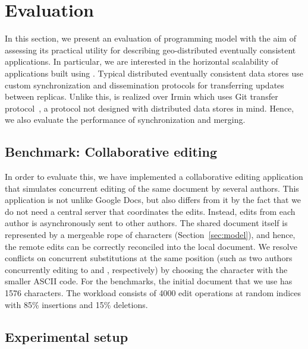 \section{Evaluation}
\label{sec:evaluation}

In this section, we present an evaluation of \name programming model with the
aim of assessing its practical utility for describing geo-distributed
eventually consistent applications. In particular, we are interested in the
horizontal scalability of applications built using \name. Typical distributed
eventually consistent data stores use custom synchronization and dissemination
protocols for transferring updates between replicas. Unlike this, \name is
realized over Irmin which uses Git transfer protocol~\cite{..}, a protocol not designed
with distributed data stores in mind. Hence, we also evaluate the performance
of synchronization and merging.

\subsection{Benchmark: Collaborative editing}

In order to evaluate this, we have implemented a collaborative editing
application that simulates concurrent editing of the same document by several
authors. This application is not unlike Google Docs, but also differs from it
by the fact that we do not need a central server that coordinates the edits.
Instead, edits from each author is asynchronously sent to other authors. The
shared document itself is represented by a mergeable rope of characters
(Section~\ref{sec:model}), and hence, the remote edits can be correctly
reconciled into the local document. We resolve conflicts on concurrent
substitutions at the same position (such as two authors concurrently editing
 to  and , respectively) by choosing the character
with the smaller ASCII code. For the benchmarks, the initial document that we
use has 1576 characters. The workload consists of 4000 edit operations at
random indices with 85\% insertions and 15\% deletions.

\subsection{Experimental setup}

